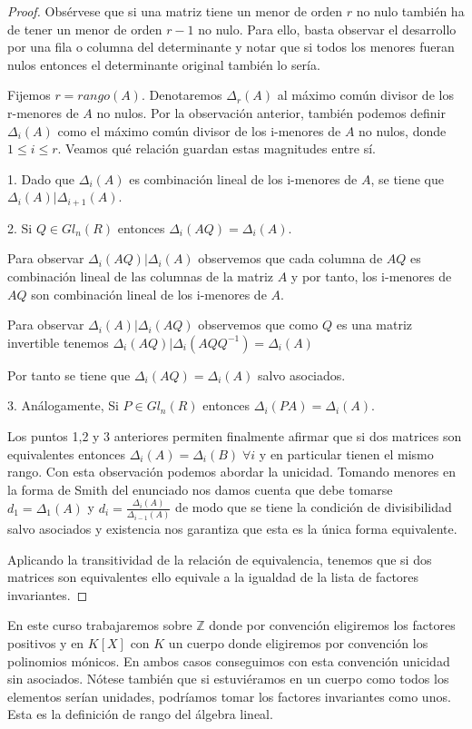 \begin{proof}
Obsérvese que si una matriz tiene un menor de orden $r$ no nulo también ha de tener un menor de orden $r-1$ no nulo. Para ello, basta observar el desarrollo por una fila o columna del determinante y notar que si todos los menores fueran nulos entonces el determinante original también lo sería.

Fijemos $r = rango(A)$. Denotaremos $\Delta_r(A)$ al máximo común divisor de los r-menores de $A$ no nulos. Por la observación anterior, también podemos definir $\Delta_i(A)$ como el máximo común divisor de los i-menores de $A$ no nulos, donde $1 \leq i \leq r$. Veamos qué relación guardan estas magnitudes entre sí.

1. Dado que $\Delta_i(A)$ es combinación lineal de los i-menores de $A$, se tiene que $\Delta_i(A) | \Delta_{i+1}(A)$.

2. Si $Q \in Gl_n(R)$ entonces $\Delta_i(AQ) = \Delta_i(A)$. 

Para observar $\Delta_i(AQ) | \Delta_i(A)$ observemos que cada columna de $AQ$ es combinación lineal de las columnas de la matriz $A$ y por tanto, los i-menores de $AQ$ son combinación lineal de los i-menores de $A$.

Para observar $\Delta_i(A) | \Delta_i(AQ)$ observemos que como $Q$ es una matriz invertible tenemos $\Delta_i(AQ) | \Delta_i(AQQ^{-1}) = \Delta_i(A)$

Por tanto se tiene que $\Delta_i(AQ) = \Delta_i(A)$ salvo asociados.

3. Análogamente, Si $P \in Gl_n(R)$ entonces $\Delta_i(PA) = \Delta_i(A)$. 

Los puntos 1,2 y 3 anteriores permiten finalmente afirmar que si dos matrices son equivalentes entonces $\Delta_i(A) = \Delta_i(B) \; \forall i$ y en particular tienen el mismo rango. Con esta observación podemos abordar la unicidad. Tomando menores en la forma de Smith del enunciado nos damos cuenta que debe tomarse $d_1 = \Delta_1(A)$ y $d_i = \frac{\Delta_i(A)}{\Delta_{i-1}(A)}$ de modo que se tiene la condición de divisibilidad salvo asociados y existencia nos garantiza que esta es la única forma equivalente. 

Aplicando la transitividad de la relación de equivalencia, tenemos que si dos matrices son equivalentes ello equivale a la igualdad de la lista de factores invariantes. 
\end{proof}

En este curso trabajaremos sobre $\mathbb{Z}$ donde por convención eligiremos los factores positivos y en $K[X]$ con $K$ un cuerpo donde eligiremos por convención los polinomios mónicos. En ambos casos conseguimos con esta convención unicidad sin asociados. Nótese también que si estuviéramos en un cuerpo como todos los elementos serían unidades, podríamos tomar los factores invariantes como unos. Esta es la definición de rango del álgebra lineal. 



















